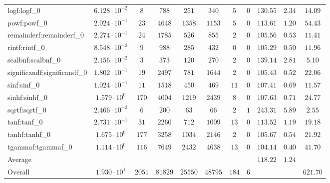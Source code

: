 \begin{tabular}{|l|c|c|c|c|c|c|c|c|c|c|}
logf:logf\_0                 & $ 6.128 \cdot 10^{-2} $ & $ 8      $ & $ 788   $ & $ 251   $ & $ 340   $ & $ 5   $ & $ 0 $ & $ 130.55      $ & $ 2.34    $ & $ 14.09   $ \\
powf:powf\_0                 & $ 2.024 \cdot 10^{-1} $ & $ 23     $ & $ 4648  $ & $ 1358  $ & $ 1153  $ & $ 5   $ & $ 0 $ & $ 113.61      $ & $ 1.20    $ & $ 54.43   $ \\
remainderf:remainderf\_0     & $ 2.274 \cdot 10^{-1} $ & $ 24     $ & $ 1785  $ & $ 526   $ & $ 855   $ & $ 2   $ & $ 0 $ & $ 105.56      $ & $ 0.53    $ & $ 11.41   $ \\
rintf:rintf\_0               & $ 8.548 \cdot 10^{-2} $ & $ 9      $ & $ 988   $ & $ 285   $ & $ 432   $ & $ 0   $ & $ 0 $ & $ 105.29      $ & $ 0.50    $ & $ 11.96   $ \\
scalbnf:scalbnf\_0           & $ 2.156 \cdot 10^{-2} $ & $ 3      $ & $ 373   $ & $ 120   $ & $ 270   $ & $ 2   $ & $ 0 $ & $ 139.14      $ & $ 2.81    $ & $ 5.10    $ \\
significandf:significandf\_0 & $ 1.802 \cdot 10^{-1} $ & $ 19     $ & $ 2497  $ & $ 781   $ & $ 1644  $ & $ 2   $ & $ 0 $ & $ 105.43      $ & $ 0.52    $ & $ 22.06   $ \\
sinf:sinf\_0                 & $ 1.024 \cdot 10^{-1} $ & $ 11     $ & $ 1518  $ & $ 450   $ & $ 469   $ & $ 11  $ & $ 0 $ & $ 107.41      $ & $ 0.69    $ & $ 11.57   $ \\
sinhf:sinhf\_0               & $ 1.579 \cdot 10^{0}  $ & $ 170    $ & $ 4004  $ & $ 1219  $ & $ 2439  $ & $ 8   $ & $ 0 $ & $ 107.63      $ & $ 0.71    $ & $ 24.77   $ \\
sqrtf:sqrtf\_0               & $ 2.466 \cdot 10^{-2} $ & $ 6      $ & $ 200   $ & $ 63    $ & $ 66    $ & $ 2   $ & $ 1 $ & $ 243.31      $ & $ 5.89    $ & $ 2.55    $ \\
tanf:tanf\_0                 & $ 2.731 \cdot 10^{-1} $ & $ 31     $ & $ 2260  $ & $ 712   $ & $ 1009  $ & $ 13  $ & $ 0 $ & $ 113.52      $ & $ 1.19    $ & $ 19.18   $ \\
tanhf:tanhf\_0               & $ 1.675 \cdot 10^{0}  $ & $ 177    $ & $ 3258  $ & $ 1034  $ & $ 2146  $ & $ 2   $ & $ 0 $ & $ 105.67      $ & $ 0.54    $ & $ 21.92   $ \\
tgammaf:tgammaf\_0           & $ 1.114 \cdot 10^{0}  $ & $ 116    $ & $ 7649  $ & $ 2432  $ & $ 4638  $ & $ 13  $ & $ 0 $ & $ 104.14      $ & $ 0.40    $ & $ 41.70   $ \\
\hline
Average                      & $                     $ & $        $ & $       $ & $       $ & $       $ & $     $ & $   $ & $ 118.22      $ & $ 1.24    $ & $         $ \\
\hline
Overall                      & $ 1.930 \cdot 10^{1}  $ & $ 2051   $ & $ 81829 $ & $ 25550 $ & $ 48795 $ & $ 184 $ & $ 6 $ & $             $ & $         $ & $ 621.70  $ \\
\hline
\end{tabular}
